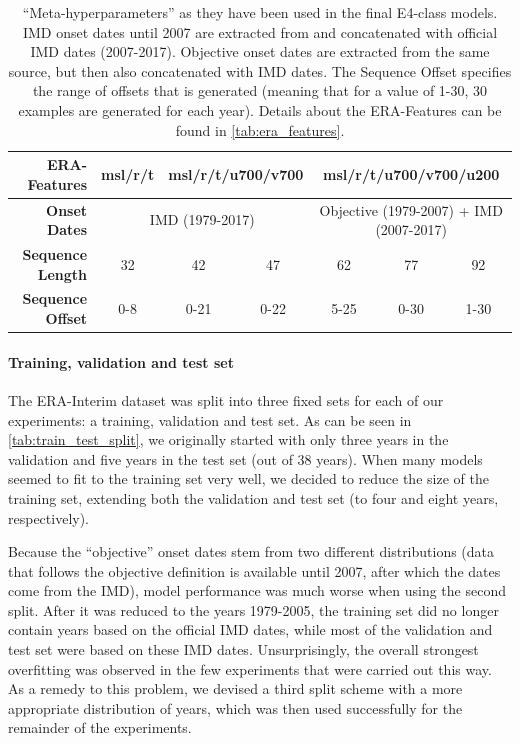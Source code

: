\begin{table}[h]
  \centering
  \begin{tabular}{|r|c|c|c|c|c|c|}
    \hline
    \textbf{ERA-Features} & \multicolumn{1}{c|}{msl/r/t} & \multicolumn{2}{c|}{msl/r/t/u700/v700} & \multicolumn{3}{c|}{msl/r/t/u700/v700/u200} \\
    \hline
    \textbf{Onset Dates} & \multicolumn{3}{c|}{IMD (1979-2017)} & \multicolumn{3}{c|}{Objective (1979-2007) + IMD (2007-2017)} \\
    \hline
    \textbf{Sequence Length} & 32 & 42 & 47 & 62 & 77 & 92 \\
    \hline
    \textbf{Sequence Offset} & 0-8 & 0-21 & 0-22 & 5-25 & 0-30 & 1-30 \\
    \hline
  \end{tabular}
  \caption{``Meta-hyperparameters'' as they have been used in the final E4-class models. IMD onset dates until 2007 are extracted from \citet{Singh.2009} and concatenated with official IMD dates (2007-2017). Objective onset dates are extracted from the same source, but then also concatenated with IMD dates. The Sequence Offset specifies the range of offsets that is generated (meaning that for a value of 1-30, 30 examples are generated for each year). Details about the ERA-Features can be found in \cref{tab:era_features}. }
  \label{tab:meta_parameters}
\end{table}

\paragraph{Training, validation and test set}
The ERA-Interim dataset was split into three fixed sets for each of our experiments: a training, validation and test set. As can be seen in \cref{tab:train_test_split}, we originally started with only three years in the validation and five years in the test set (out of 38 years). When many models seemed to fit to the training set very well, we decided to reduce the size of the training set, extending both the validation and test set (to four and eight years, respectively).

Because the ``objective'' onset dates stem from two different distributions (data that follows the objective definition is available until 2007, after which the dates come from the IMD), model performance was much worse when using the second split. After it was reduced to the years 1979-2005, the training set did no longer contain years based on the official IMD dates, while most of the validation and test set were based on these IMD dates. Unsurprisingly, the overall strongest overfitting was observed in the few experiments that were carried out this way. As a remedy to this problem, we devised a third split scheme with a more appropriate distribution of years, which was then used successfully for the remainder of the experiments.

